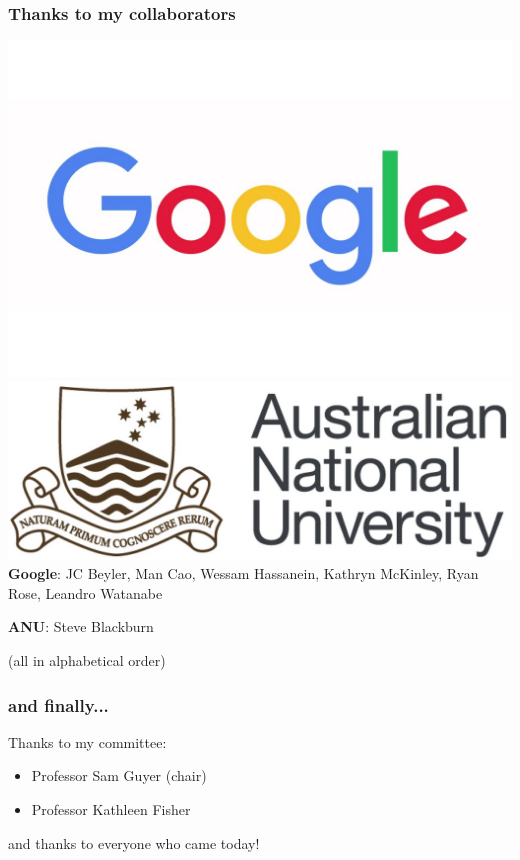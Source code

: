 \documentclass[11pt]{beamer}
\begin{document}
\begin{frame}
  \frametitle{Thanks to my collaborators}
  \includegraphics[scale=0.1]{google.jpg}
  \hspace*{\fill}
  \includegraphics[scale=0.1]{anu.jpeg}
  \textbf{Google}: JC Beyler, Man Cao, Wessam Hassanein, Kathryn McKinley, Ryan Rose,
  Leandro Watanabe
  
  \textbf{ANU}: Steve Blackburn

  (all in alphabetical order)
\end{frame}

\begin{frame}
  \frametitle{and finally...}
  Thanks to my committee:
  \begin{itemize}
  \item Professor Sam Guyer (chair)
  \item Professor Kathleen Fisher
  \end{itemize}

  and thanks to everyone who came today!
\end{frame}
\end{document}
